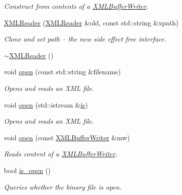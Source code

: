 \begin{DoxyCompactItemize}
\begin{DoxyCompactList}\small\item\em Construct from contents of a \mbox{\hyperlink{classADATXML_1_1XMLBufferWriter}{X\+M\+L\+Buffer\+Writer}}. \end{DoxyCompactList}\item 
\mbox{\hyperlink{classADATXML_1_1XMLReader_aef69d83a0f47db461436fc2fd3bb7723}{X\+M\+L\+Reader}} (\mbox{\hyperlink{classADATXML_1_1XMLReader}{X\+M\+L\+Reader}} \&old, const std\+::string \&xpath)
\begin{DoxyCompactList}\small\item\em Clone and set path -- the new side effect free interface. \end{DoxyCompactList}\item 
\mbox{\hyperlink{classADATXML_1_1XMLReader_a98c4936a3366f39443113290b7bd164a}{$\sim$\+X\+M\+L\+Reader}} ()
\item 
void \mbox{\hyperlink{classADATXML_1_1XMLReader_ad5dcbd08800bc67ac4a91f93cb1504b0}{open}} (const std\+::string \&filename)
\begin{DoxyCompactList}\small\item\em Opens and reads an X\+ML file. \end{DoxyCompactList}\item 
void \mbox{\hyperlink{classADATXML_1_1XMLReader_a7938cc7e08b0381e467eb7b916cbbd97}{open}} (std\+::istream \&\mbox{\hyperlink{x_8cc_a81abbbdef81e25584a2eab888e643d3d}{is}})
\begin{DoxyCompactList}\small\item\em Opens and reads an X\+ML file. \end{DoxyCompactList}\item 
void \mbox{\hyperlink{classADATXML_1_1XMLReader_a38615b0ae22722bd15a47e27953dc77c}{open}} (const \mbox{\hyperlink{classADATXML_1_1XMLBufferWriter}{X\+M\+L\+Buffer\+Writer}} \&mw)
\begin{DoxyCompactList}\small\item\em Reads content of a \mbox{\hyperlink{classADATXML_1_1XMLBufferWriter}{X\+M\+L\+Buffer\+Writer}}. \end{DoxyCompactList}\item 
bool \mbox{\hyperlink{classADATXML_1_1XMLReader_ae9e467fca3d4bf34351dc00e9797a06f}{is\+\_\+open}} ()
\begin{DoxyCompactList}\small\item\em Queries whether the binary file is open. \end{DoxyCompactList}\item 

\end{DoxyCompactItemize}
